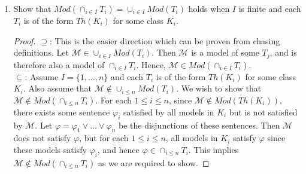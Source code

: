 \documentclass{article}
\begin{document}
\begin{enumerate}
\begin{enumerate}
\begin{proof}
          $\subseteq$: Let $\mathcal{M}\in Mod(\cup_{i\in I}T_i)$. Then
          given any $T_i$, $\mathcal{M}$ satisfies each sentence in $T_i$,
          so $\mathcal{M}\in Mod(T_i)$. Hence $\mathcal{M}\in \cap_{i\in
          I}Mod(T_i)$. \\

          $\supseteq$: Let $\mathcal{M}\not\in Mod(\cup_{i\in I}T_i)$.
          Then there exists a sentence in $\cup_{i\in I}T_i$ that is
          not satisfied by $\mathcal{M}$. This sentence must be contained
          in some $T_i$, so $\mathcal{M}$ is not a model of $T_i$. Hence
          $\mathcal{M}$ also cannot be a model of $\cap_{i\in I}Mod(T_i)$.
        \end{proof}

      \item Show that $Mod(\cap_{i\in I}T_i)=\cup_{i\in I}Mod(T_i)$ holds
        when $I$ is finite and each $T_i$ is of the form $Th(K_i)$ for some
        class $K_i$.

        \begin{proof}
          $\supseteq$: This is the easier direction which can be proven
          from chasing definitions. Let $\mathcal{M}\in \cup_{i\in
          I}Mod(T_i)$. Then $\mathcal{M}$ is a model of some $T_j$, and is
          therefore also a model of $\cap_{i\in I}T_i$. Hence,
          $\mathcal{M}\in Mod(\cap_{i\in I}T_i)$. \\

          $\subseteq$: Assume $I=\{1,\ldots,n\}$ and each $T_i$ is of the
          form $Th(K_i)$ for some class $K_i$. Also assume that
          $\mathcal{M}\not\in\cup_{i\leq n}Mod(T_i)$. We wish to show that
          $\mathcal{M}\not\in Mod(\cap_{i\leq n}T_i)$. For each $1\leq
          i\leq n$, since $\mathcal{M}\not\in Mod(Th(K_i))$, there exists some
          sentence $\varphi_i$ satisfied by all models in $K_i$ but is not
          satisfied by $\mathcal{M}$. Let
          $\varphi=\varphi_1\vee\ldots\vee\varphi_n$ be the disjunctions
          of these sentences. Then $\mathcal{M}$ does not satisfy
          $\varphi$, but for each $1\leq i\leq n$, all models in $K_i$
          satisfy $\varphi$ since these models satisfy $\varphi_i$, and
          hence $\varphi\in\cap_{i\leq n}T_i$. This implies
          $\mathcal{M}\not\in Mod(\cap_{i\leq n}T_i)$ as we are required to
          show.
        \end{proof}
    \end{enumerate}
\end{enumerate}
\end{document}

